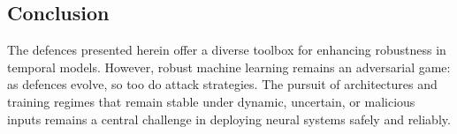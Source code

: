 \subsection{Conclusion}

The defences presented herein offer a diverse toolbox for enhancing robustness in temporal models. However, robust machine learning remains an adversarial game: as defences evolve, so too do attack strategies. The pursuit of architectures and training regimes that remain stable under dynamic, uncertain, or malicious inputs remains a central challenge in deploying neural systems safely and reliably.